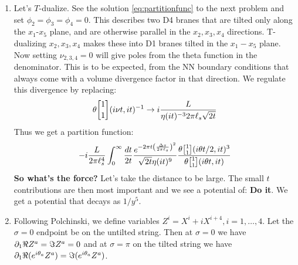 \documentclass[11pt, class=article, crop=false]{standalone}
\begin{document}
\begin{enumerate}
	\item Let's $T$-dualize. See the solution \eqref{eq:partitionfunc} to the next problem and set $\phi_2 = \phi_3 = \phi_4 = 0$. This describes two D4 branes that are tilted only along the $x_1$-$x_5$ plane, and are otherwise parallel in the $x_2, x_3, x_4$ directions. T-dualizing $x_2, x_3, x_4$ makes these into D1 branes tilted in the $x_1 - x_5$ plane. Now setting $\nu_{2,3,4} = 0$ will give poles from the theta function in the denominator. This is to be expected, from the NN boundary conditions that always come with a volume divergence factor in that direction. We regulate this divergence by replacing:
	\[
		\theta\twist11 (i \nu t, i t)^{-1} \to i \frac{L}{\eta(i t)^{-3} 2 \pi \ell_s \sqrt{2 t}}
	\]
	Thus we get a partition function:
	\[
		-i \frac{L}{2 \pi \ell_s^4}\int_0^\infty \frac{dt}{2t} \frac{e^{-2 \pi t \left( \frac{\Delta x}{2\pi \ell_s} \right)^2}}{\sqrt{2t} \eta(it)^9} \frac{\theta \twist11 (i \theta t/2, i t)^3}{\theta \twist11 (i \theta t, it)}
	\]
	\textbf{So what's the force?} Let's take the distance to be large. The small $t$ contributions are then most important and we see a potential of: \textbf{Do it}. We get a potential that decays as $1/y^5$.
	
	\item Following Polchinski, we define variables $Z^i = X^i + i X^{i+4}, i= 1, \dots, 4$. Let the $\sigma = 0$ endpoint be on the untilted string. Then at $\sigma = 0$ we have $\partial_1 \Re Z^a = \Im Z^a = 0$ and at $\sigma = \pi$ on the tilted string we have $\partial_1 \Re(e^{i \theta_a} Z^a) = \Im(e^{i \theta_a} Z^a)$. 
	

\end{enumerate}
\end{document}
